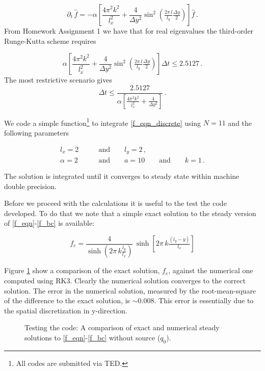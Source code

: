 \documentclass[11pt]{article}
\newcommand{\com}{\, ,}
\newcommand{\per}{\, .}
\def\beq{\begin{equation}}
\def\eeq{\end{equation}}
\begin{document}
\begin{enumerate}[label=(\alph*)]
        \beq
        \partial_t\,\hat f = - \alpha\left[\frac{4\pi^2k^2}{l_x^2} + \frac{4}{\Delta y^2}\sin^2\left(\tfrac{2\pi\,l}{l_y}\tfrac{\Delta y}{2}\right)\right] \hat f \per
        \eeq
        From Homework Assignment 1 we have that for real eigenvalues the third-order Runge-Kutta scheme requires

        \beq
             \alpha\left[\frac{4\pi^2k^2}{l_x^2} + \frac{4}{\Delta y^2}\sin^2\left(\tfrac{2\pi\,l}{l_y}\tfrac{\Delta y}{2}\right)\right] \Delta t \leq 2.5127\per
        \eeq
        The most restrictive scenario gives 
        \beq
        \label{stability_rk3}
        \Delta t \leq \frac{2.5127}{\alpha\left[\frac{4\pi^2k^2}{l_x^2} + \frac{4}{\Delta y^2}\right] }\per
        \eeq

        We code a simple function\footnote{All codes are submitted via TED.} to integrate \eqref{f_eqn_discrete} using $N=11$ and the following parameters

        \begin{align}
            l_x = 2& \qquad\text{and}\qquad l_y=2\com \nonumber\\
            \alpha = 2 & \qquad\text{and}\qquad a=10 \qquad \text{and}\qquad k=1\per
        \end{align}


        The solution is integrated until it converges to steady state within machine double precision. 
        
        Before we proceed with the calculations it is useful to the test the code developed. To do that we note that a simple exact solution to the steady version of \eqref{f_eqn}-\eqref{f_bc} is available:

        \beq
            \label{f_bcc}
            f_e  = \frac{4}{\sinh{\left(2\pi\,k\tfrac{l_y}{l_x}\right)}}\,\sinh{\left[2\pi\,k\tfrac{\left(l_y-y\right)}{l_x}\right]}
        \eeq


        Figure \ref{comp_exact} show a comparison of the exact solution, $f_e$, against the numerical one computed using RK3. Clearly the numerical solution converges to the correct solution. The error in the numerical solution, measured by the root-mean-square of the difference to the exact solution, is $\sim 0.008$. This error is essentially due to the spatial discretization in y-direction.

        \begin{figure}[p]
        \centerline{}
        \caption{Testing the code: A comparison of exact and numerical steady solutions to  \eqref{f_eqn}-\eqref{f_bc} without source ($q_0$).}
        \label{comp_exact}
        \end{figure}



\end{enumerate}
\end{document}
